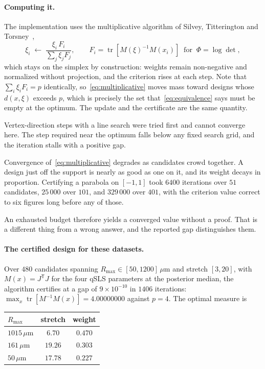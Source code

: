 \documentclass[10pt]{article}
\begin{document}
\paragraph{Computing it.}
The implementation uses the multiplicative algorithm of Silvey, Titterington and
Torsney~\citep{silvey1978algorithm},
%
\begin{equation}
\xi_i \;\longleftarrow\; \frac{\xi_i\,F_i}{\sum_j \xi_j F_j},
\qquad
F_i = \operatorname{tr}\!\left[M(\xi)^{-1}M(x_i)\right]
\;\;\text{for}\;\; \Phi = \log\det,
\label{eq:multiplicative}
\end{equation}
%
which stays on the simplex by construction: weights remain non-negative and normalized
without projection, and the criterion rises at each step. Note that
$\sum_i \xi_i F_i = p$ identically, so~\eqref{eq:multiplicative} moves mass toward designs
whose $d(x,\xi)$ exceeds $p$, which is precisely the set that~\eqref{eq:equivalence} says
must be empty at the optimum. The update and the certificate are the same quantity.

Vertex-direction steps with a line search were tried first and cannot converge here. The step
required near the optimum falls below any fixed search grid, and the iteration stalls with a
positive gap.

Convergence of~\eqref{eq:multiplicative} degrades as candidates crowd together. A design just
off the support is nearly as good as one on it, and its weight decays in proportion.
Certifying a parabola on $[-1,1]$ took $6400$ iterations over $51$ candidates, $25\,000$ over
$101$, and $329\,000$ over $401$, with the criterion value correct to six figures long
before any of those.

An exhausted budget therefore yields a converged value without a proof. That is a different
thing from a wrong answer, and the reported gap distinguishes them.

\paragraph{The certified design for these datasets.}
Over $480$ candidates spanning $R_{\max} \in [50, 1200]\,\mu$m and stretch $[3, 20]$, with
$M(x) = J^{\mathsf T}J$ for the four qSLS parameters at the posterior median, the algorithm
certifies at a gap of $9\times10^{-10}$ in $1406$ iterations:
$\max_x \operatorname{tr}[M^{-1}M(x)] = 4.00000000$ against $p = 4$. The optimal measure is

\begin{center}
\begin{tabular}{lcc}
\toprule
$R_{\max}$ & stretch & weight \\
\midrule
$1015\,\mu$m & $6.70$ & $0.470$ \\
$161\,\mu$m  & $19.26$ & $0.303$ \\
$50\,\mu$m   & $17.78$ & $0.227$ \\
\bottomrule
\end{tabular}
\end{center}
\end{document}
